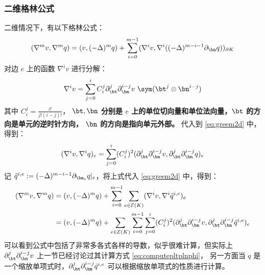 \subsubsection{二维格林公式}
二维情况下，有以下格林公式：
\begin{equation}
\label{eq:greem2d}
\begin{aligned}
    (\nabla^m v, \nabla^m q) & = (v, (-\Delta)^m q) + \sum_{i=0}^{m-1}
    (\nabla^i v, \nabla^{i}((-\Delta)^{m-i-1}\partial_{\bn} q))_{\partial K}\\
\end{aligned}
\end{equation}
对边 $e$ 上的函数 $\nabla^i v$ 进行分解：
$$
\nabla^i v = \sum_{j=0}^{i} C_i^j \partial^j_{\bt} \partial^{i-j}_{\bn} v
\ \sym({\bt^j\otimes\bn^{i-j}})
$$
其中 $C_i^j = \frac{i!}{j!(i-j)!}$， 
\textbf{
$\bt, \bn$ 分别是 $e$ 上的单位切向量和单位法向量，$\bt$ 的方向是单元的逆时针方向，
$\bn$ 的方向是指向单元外部。
} 
代入到 \eqref{eq:greem2d} 中，得到：
\begin{equation}
\begin{aligned}
(\nabla^i v, \nabla^{i} q)_e & = 
\sum_{j=0}^{i} (C_i^j)^2 
(\partial^j_{\bt} \partial^{i-j}_{\bn} v, \partial^{j}_{\bt}
\partial^{i-j}_{\bn} q)_e\\
\end{aligned}
\end{equation}
记 $\tilde{q}^{i, e} := (-\Delta)^{m-i-1} \partial_{\bn_e} q|_e$，将上式代入
\eqref{eq:greem2d} 中，得到：
\begin{equation}
\label{eq:greem2d2}
\begin{aligned}
    (\nabla^m v, \nabla^m q) & = (v, (-\Delta)^m q) + \sum_{i=0}^{m-1}
    \sum_{e\in \mathcal{E}(K)}
    (\nabla^i v, \nabla^{i}\tilde{q}^{i,e})_{e}\\
    & = (v, (-\Delta)^m q) + \sum_{e\in \mathcal{E}(K)} \sum_{i=0}^{m-1}
    \sum_{j=0}^{i} (C_i^j)^2 (\partial^j_{\bt} \partial^{i-j}_{\bn} v,
    \partial^{j}_{\bt} \partial^{i-j}_{\bn} \tilde{q}^{i,e})_e
\end{aligned}
\end{equation}
可以看到公式中包括了非常多各式各样的导数，似乎很难计算，但实际上 
$\partial_{\bt}^j\partial_{\bn}^{i-j} v$ 上一节已经讨论过其计算方式
\eqref{eq:computepltplnphi}，
另一方面当 $q$ 是一个缩放单项式时，$\partial_{\bt}^j\partial_{\bn}^{i-j}
\tilde{q}^{i,e}$ 可以根据缩放单项式的性质进行计算。

